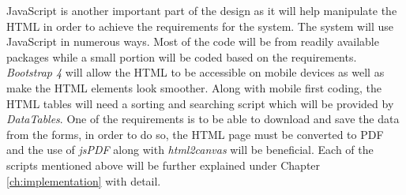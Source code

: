\documentclass[../main.tex]{subfiles}
\begin{document}
\raggedright
JavaScript is another important part of the design as it will help manipulate the HTML in order to achieve the requirements for the system. The system will use JavaScript in numerous ways. Most of the code will be from readily available packages while a small portion will be coded based on the requirements. \textit{Bootstrap 4}\cite{bootstrapfour} will allow the HTML to be accessible on mobile devices as well as make the HTML elements look smoother. Along with mobile first coding, the HTML tables will need a sorting and searching script which will be provided by \textit{DataTables}\cite{datatables}. One of the requirements is to be able to download and save the data from the forms, in order to do so, the HTML page must be converted to PDF and the use of \textit{jsPDF}\cite{jsPDF} along with \textit{html2canvas}\cite{htmlcanvas} will be beneficial. Each of the scripts mentioned above will be further explained under Chapter \ref{ch:implementation} with detail.
\end{document}
